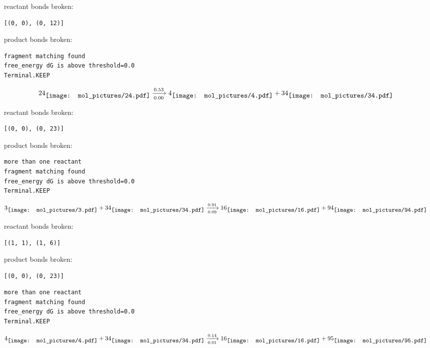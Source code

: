 \documentclass{article}
\begin{document}
reactant bonds broken:\begin{verbatim}
[(0, 0), (0, 12)]
\end{verbatim}
product bonds broken:



\vspace{1cm}
\begin{verbatim}
fragment matching found
free_energy dG is above threshold=0.0
Terminal.KEEP
\end{verbatim}
$$
24
\raisebox{-.5\height}{\texttt{[image: mol\_pictures/24.pdf]}}
\xrightarrow[0.00]{0.53}
4
\raisebox{-.5\height}{\texttt{[image: mol\_pictures/4.pdf]}}
+
34
\raisebox{-.5\height}{\texttt{[image: mol\_pictures/34.pdf]}}
$$


reactant bonds broken:\begin{verbatim}
[(0, 0), (0, 23)]
\end{verbatim}
product bonds broken:



\vspace{1cm}
\begin{verbatim}
more than one reactant
fragment matching found
free_energy dG is above threshold=0.0
Terminal.KEEP
\end{verbatim}
$$
3
\raisebox{-.5\height}{\texttt{[image: mol\_pictures/3.pdf]}}
+
34
\raisebox{-.5\height}{\texttt{[image: mol\_pictures/34.pdf]}}
\xrightarrow[0.09]{0.91}
16
\raisebox{-.5\height}{\texttt{[image: mol\_pictures/16.pdf]}}
+
94
\raisebox{-.5\height}{\texttt{[image: mol\_pictures/94.pdf]}}
$$


reactant bonds broken:\begin{verbatim}
[(1, 1), (1, 6)]
\end{verbatim}
product bonds broken:\begin{verbatim}
[(0, 0), (0, 23)]
\end{verbatim}




\vspace{1cm}
\begin{verbatim}
more than one reactant
fragment matching found
free_energy dG is above threshold=0.0
Terminal.KEEP
\end{verbatim}
$$
4
\raisebox{-.5\height}{\texttt{[image: mol\_pictures/4.pdf]}}
+
34
\raisebox{-.5\height}{\texttt{[image: mol\_pictures/34.pdf]}}
\xrightarrow[0.01]{0.14}
16
\raisebox{-.5\height}{\texttt{[image: mol\_pictures/16.pdf]}}
+
95
\raisebox{-.5\height}{\texttt{[image: mol\_pictures/95.pdf]}}
$$
\end{document}
